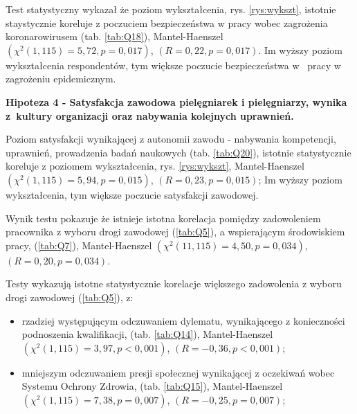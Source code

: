 \documentclass[a4paper,12pt,twoside,openright]{mwrep}
\begin{document}
	Test statystyczny wykazał że poziom wykształcenia, rys. \ref{rys:wykszt},  istotnie staystycznie koreluje z poczuciem bezpieczeństwa w pracy wobec zagrożenia koronarowirusem  (tab. \ref{tab:Q18}), Mantel-Haenszel $(\chi^2 (1, 115) = 5,72, p=0,017)$, $(R = 0,22, p = 0,017)$. Im wyższy poziom wykształcenia respondentów, tym większe poczucie bezpieczeństwa w~ pracy w zagrożeniu epidemicznym.
	
\vspace{\baselineskip}
\textbf{Hipoteza 4 - Satysfakcja zawodowa pielęgniarek i pielęgniarzy, wynika z~kultury organizacji oraz nabywania kolejnych uprawnień.}
\vspace{\baselineskip}




  
  Poziom satysfakcji wynikającej z autonomii zawodu  - nabywania kompetencji, uprawnień, prowadzenia badań naukowych  (tab. \ref{tab:Q20}), istotnie statystycznie koreluje z poziomem wykształcenia, rys. \ref{rys:wykszt}, Mantel-Haenszel $(\chi^2 (1, 115) = 5,94, p = 0,015)$, $(R = 0,23, p = 0,015)$; Im wyższy poziom wykształcenia, tym większe poczucie satysfakcji zawodowej.
  
Wynik testu pokazuje że istnieje istotna korelacja pomiędzy zadowoleniem pracownika z wyboru drogi zawodowej  (\ref{tab:Q5}), a wspierającym środowiskiem pracy, (\ref{tab:Q7}), Mantel-Haenszel $(\chi^2 (11, 115) = 4,50, p=0,034)$, $(R = 0,20, p = 0,034)$.

Testy wykazują istotne statystycznie korelacje większego zadowolenia z wyboru drogi zawodowej  (\ref{tab:Q5}), z:
	\begin{itemize}
		\item rzadziej występującym odczuwaniem dylematu, wynikającego z konieczności podnoszenia kwalifikacji, (tab. \ref{tab:Q14}), Mantel-Haenszel $(\chi^2 (1, 115) = 3,97, p < 0,001)$, $(R = -0,36, p < 0,001)$;
		\item mniejszym odczuwaniem presji społecznej wynikającej z oczekiwań wobec Systemu Ochrony Zdrowia, (tab. \ref{tab:Q15}), Mantel-Haenszel $(\chi^2 (1, 115) = 7,38, p = 0,007)$, $(R = -0,25, p = 0,007)$;
	\end{itemize}
\end{document}
